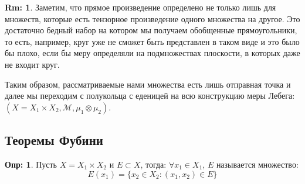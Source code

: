 \documentclass[12pt]{article}
\newcommand{\MM}{\mathcal{M}}
\theoremstyle{definition}
\newtheorem{defn}{Опр:}
\newtheorem{rem}{Rm:}
\begin{document}
\begin{rem}
	Заметим, что прямое произведение определено не только лишь для множеств, которые есть тензорное произведение одного множества на другое. Это достаточно бедный набор на котором мы получаем обобщенные прямоугольники, то есть, например, круг уже не сможет быть представлен в таком виде и это было бы плохо, если бы меру определяли на подмножествах плоскости, в которых даже не входит круг. 
	
	Таким образом, рассматриваемые нами множества есть лишь отправная точка и далее мы переходим с полукольца с еденицей на всю конструкцию меры Лебега: $(X = X_1 \times  X_2, \MM, \mu_1 \otimes \mu_2)$.
\end{rem}
\newpage
\subsection*{Теоремы Фубини}

\begin{defn}
	Пусть $X = X_1 \times X_2$ и $E \subset X$, тогда: $\forall x_1 \in X_1$,  $E$ называется множество:
	$$
		E(x_1) = \{x_2 \in X_2 \colon (x_1, x_2) \in E\}
	$$
\end{defn}
\end{document}
